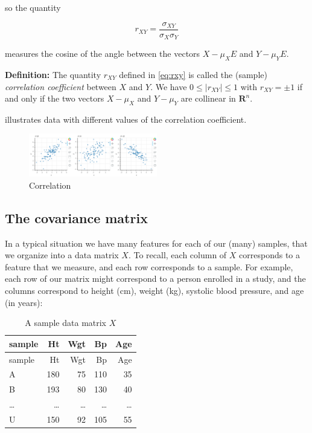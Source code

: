 \documentclass[
  oneside]{scrbook}
\makeatletter
\newcounter{tableno}
\newenvironment{tablenos:no-prefix-table-caption}{
  \caption@ifcompatibility{}{
    \let\oldthetable\thetable
    \let\oldtheHtable\theHtable
    \renewcommand{\thetable}{tableno:\thetableno}
    \renewcommand{\theHtable}{tableno:\thetableno}
    \stepcounter{tableno}
    \captionsetup{labelformat=empty}
  }
}{
  \caption@ifcompatibility{}{
    \captionsetup{labelformat=default}
    \let\thetable\oldthetable
    \let\theHtable\oldtheHtable
    \addtocounter{table}{-1}
  }
}
\makeatother
\begin{document}
so the quantity

\begin{equation}
r_{XY} = \frac{\sigma_{XY}}{\sigma_{X}\sigma_{Y}}
\label{eq:rxy}\end{equation}

measures the cosine of the angle between the vectors \(X-\mu_{X}E\) and
\(Y-\mu_{Y}E\).

\textbf{Definition:} The quantity \(r_{XY}\) defined in \cref{eq:rxy} is
called the (sample) \emph{correlation coefficient} between \(X\) and
\(Y\). We have \(0\le |r_{XY}|\le 1\) with \(r_{XY}=\pm 1\) if and only
if the two vectors \(X-\mu_{X}\) and \(Y-\mu_{Y}\) are collinear in
\(\mathbf{R}^{n}\).

 illustrates data with different values of the
correlation coefficient.

\begin{figure}
\hypertarget{fig:corrfig}{%
\centering
\includegraphics[width=0.5\textwidth,height=\textheight]{img/correlation.png}
\caption{Correlation}\label{fig:corrfig}
}
\end{figure}

\hypertarget{sec:covarmat}{%
\subsection{The covariance matrix}\label{sec:covarmat}}

In a typical situation we have many features for each of our (many)
samples, that we organize into a data matrix \(X\). To recall, each
column of \(X\) corresponds to a feature that we measure, and each row
corresponds to a sample. For example, each row of our matrix might
correspond to a person enrolled in a study, and the columns correspond
to height (cm), weight (kg), systolic blood pressure, and age (in
years):

\begin{tablenos:no-prefix-table-caption}

\begin{longtable}[]{@{}lrrrr@{}}
\caption{A sample data matrix \(X\)}\tabularnewline
\toprule
sample & Ht & Wgt & Bp & Age \\
\midrule
\endfirsthead
\toprule
sample & Ht & Wgt & Bp & Age \\
\midrule
\endhead
A & 180 & 75 & 110 & 35 \\
B & 193 & 80 & 130 & 40 \\
\ldots{} & \ldots{} & \ldots{} & \ldots{} & \ldots{} \\
U & 150 & 92 & 105 & 55 \\
\bottomrule
\end{longtable}

\end{tablenos:no-prefix-table-caption}
\end{document}
